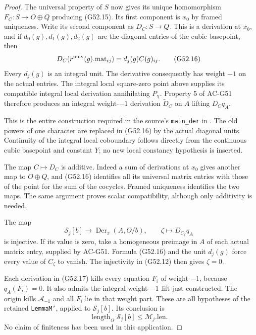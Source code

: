 \begin{proof}
The universal property of $S$ now gives its unique
homomorphism $F_C:S\to O\oplus Q$ producing (G52.15).
Its first component is $x_0$ by framed uniqueness.
Write its second component as $D_C:S\to Q$.
This is a derivation at $x_0$, and if
$d_0(g),d_1(g),d_2(g)$ are the diagonal entries of
the cubic basepoint, then
\[
          D_C(r^{\rm univ}(g).\mathrm{mat}_{ij})
                               =d_j(g)C(g)_{ij}.             \tag{G52.16}
\]
Every $d_j(g)$ is an integral unit.
The derivative consequently has weight $-1$ on the
actual entries.  The integral local square-zero
point above supplies its compatible integral local
derivation annihilating $P_\chi$.
Property 5 of AC-G51 therefore produces an integral
weight-$-1$ derivation $\widetilde D_C$ on $A$ lifting
$D_Cq_A$.

This is the entire construction required in the
source's \texttt{main\_der} in
.
The old powers of one character are replaced in
(G52.16) by the actual diagonal units.
Continuity of the integral local coboundary follows
directly from the continuous cubic basepoint and
constant $Y$; no new local constancy hypothesis is
inserted.

The map $C\mapsto D_C$ is additive.
Indeed a sum of derivations at $x_0$ gives another
map to $O\oplus Q$, and (G52.16) identifies all its
universal matrix entries with those of the point for
the sum of the cocycles.  Framed uniqueness identifies
the two maps.  The same argument proves scalar
compatibility, although only additivity is needed.

The map
\[
 \mathcal S_j[b]\longrightarrow
              \operatorname{Der}_{x}(A,O/b),
       \qquad \zeta\longmapsto D_{C_\zeta}q_A              \tag{G52.17}
\]
is injective.  If its value is zero, take a homogeneous
preimage in $A$ of each actual matrix entry, supplied
by AC-G51.  Formula (G52.16) and the unit $d_j(g)$
force every value of $C_\zeta$ to vanish.
The injectivity in (G52.12) then gives $\zeta=0$.

Each derivation in (G52.17) kills every equation
$F_i$ of weight $-1$, because $q_A(F_i)=0$.
It also admits the integral weight-$-1$ lift just
constructed.  The origin kills $\mathcal A_{-1}$
and all $F_i$ lie in that weight part.
These are all hypotheses of the retained
\texttt{LemmaM'}, applied to $\mathcal S_j[b]$.
Its conclusion is
\[
                 \operatorname{length}_O\mathcal S_j[b]
                               \le\mathcal M_j.\mathrm{len}.
                                                               \tag{G52.18}
\]
No claim of finiteness has been used in this application.


\end{proof}
